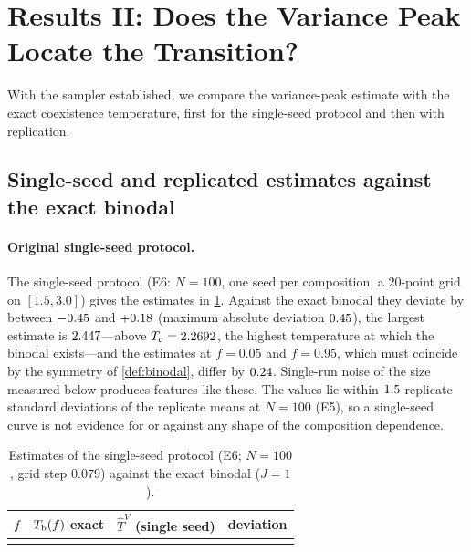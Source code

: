 \section{Results II: Does the Variance Peak Locate the Transition?}
\label{sec:results-demix}
With the sampler established, we compare the variance-peak estimate with the exact coexistence temperature, first for the single-seed protocol and then with replication.

\subsection{Single-seed and replicated estimates against the exact binodal}
\paragraph{Original single-seed protocol.} The single-seed protocol (E6: $N=100$, one seed per composition, a $20$-point grid on $[1.5,3.0]$) gives the estimates in \cref{tab:repo}. Against the exact binodal they deviate by between $-0.45$ and $+0.18$ (maximum absolute deviation $0.45$), the largest estimate is $2.447$---above $T_{\mathrm c}=2.2692$, the highest temperature at which the binodal exists---and the estimates at $f=0.05$ and $f=0.95$, which must coincide by the symmetry of \cref{def:binodal}, differ by $0.24$. Single-run noise of the size measured below produces features like these. The values lie within $1.5$ replicate standard deviations of the replicate means at $N=100$ (E5), so a single-seed curve is not evidence for or against any shape of the composition dependence.

\begin{table}[t]
\centering\small
\caption{Estimates of the single-seed protocol (E6; $N=100$, grid step $0.079$) against the exact binodal ($J=1$).}
\label{tab:repo}
\begin{tabular}{@{}cccc@{}}
\toprule
$f$ & $T_{\mathrm b}(f)$ exact & $\hat T^V$ (single seed) & deviation\\
\midrule
\\
\bottomrule
\end{tabular}
\end{table}


